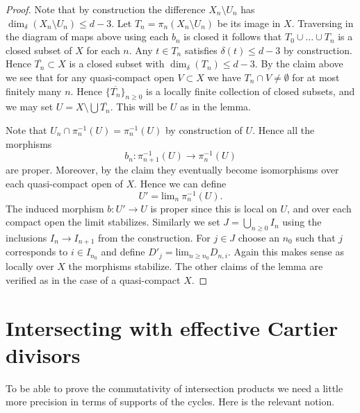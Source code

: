 \begin{proof}
\medskip\noindent
Note that by construction the difference $X_n \setminus U_n$
has $\dim_\delta(X_n \setminus U_n) \leq d - 3$. 
Let $T_n = \pi_n(X_n \setminus U_n)$ be its image in $X$.
Traversing in the diagram of maps above using each $b_n$ is closed
it follows that $T_0 \cup \ldots \cup T_n$ is a closed subset of $X$
for each $n$. Any $t \in T_n$ satisfies $\delta(t) \leq d - 3$
by construction. Hence $\overline{T_n} \subset X$ is a closed subset
with $\dim_\delta(T_n) \leq d - 3$. By the claim above we see
that for any quasi-compact open $V \subset X$ we have
$T_n \cap V \not = \emptyset$ for at most finitely many $n$.
Hence $\{\overline{T_n}\}_{n \geq 0}$ is a locally finite
collection of closed subsets, and we may set
$U = X \setminus \bigcup \overline{T_n}$. This will be
$U$ as in the lemma.

\medskip\noindent
Note that $U_n \cap \pi_n^{-1}(U) = \pi_n^{-1}(U)$ by construction
of $U$. Hence all the morphisms
$$
b_n : \pi_{n + 1}^{-1}(U) \longrightarrow \pi_n^{-1}(U)
$$
are proper. Moreover, by the claim they eventually become isomorphisms
over each quasi-compact open of $X$. Hence we can define
$$
U' = \text{lim}_n\ \pi_n^{-1}(U).
$$
The induced morphism $b : U' \to U$ is proper since this is local
on $U$, and over each compact open the limit stabilizes. Similarly
we set $J = \bigcup_{n \geq 0} I_n$ using the inclusions
$I_n \to I_{n + 1}$ from the construction. For $j \in J$ choose
an $n_0$ such that $j$ corresponds to $i \in I_{n_0}$ and define
$D'_j = \text{lim}_{n \geq n_0} D_{n, i}$. Again this makes sense
as locally over $X$ the morphisms stabilize.
The other claims of the lemma are verified as in the case
of a quasi-compact $X$.
\end{proof}







\section{Intersecting with effective Cartier divisors}
\label{section-intersecting-effective-Cartier}

\noindent
To be able to prove the commutativity of intersection
products we need a little more precision in terms of
supports of the cycles. Here is the relevant notion.

